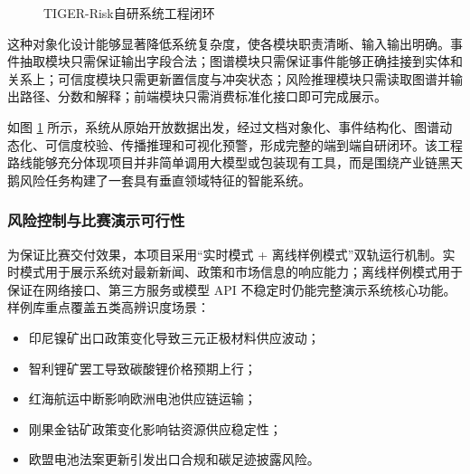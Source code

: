 \documentclass[12pt,a4paper]{article}
\newcommand{\projectshort}{TIGER-Risk}
\begin{document}
\begin{figure}[H]
{
}
\caption{\projectshort 自研系统工程闭环}
\label{fig:self-built-engineering-loop}
\end{figure}

这种对象化设计能够显著降低系统复杂度，使各模块职责清晰、输入输出明确。事件抽取模块只需保证输出字段合法；图谱模块只需保证事件能够正确挂接到实体和关系上；可信度模块只需更新置信度与冲突状态；风险推理模块只需读取图谱并输出路径、分数和解释；前端模块只需消费标准化接口即可完成展示。

如图 \ref{fig:self-built-engineering-loop} 所示，系统从原始开放数据出发，经过文档对象化、事件结构化、图谱动态化、可信度校验、传播推理和可视化预警，形成完整的端到端自研闭环。该工程路线能够充分体现项目并非简单调用大模型或包装现有工具，而是围绕产业链黑天鹅风险任务构建了一套具有垂直领域特征的智能系统。

\subsubsection{风险控制与比赛演示可行性}

为保证比赛交付效果，本项目采用“实时模式 + 离线样例模式”双轨运行机制。实时模式用于展示系统对最新新闻、政策和市场信息的响应能力；离线样例模式用于保证在网络接口、第三方服务或模型 API 不稳定时仍能完整演示系统核心功能。样例库重点覆盖五类高辨识度场景：
\begin{itemize}
    \item 印尼镍矿出口政策变化导致三元正极材料供应波动；
    \item 智利锂矿罢工导致碳酸锂价格预期上行；
    \item 红海航运中断影响欧洲电池供应链运输；
    \item 刚果金钴矿政策变化影响钴资源供应稳定性；
    \item 欧盟电池法案更新引发出口合规和碳足迹披露风险。
\end{itemize}
\end{document}
